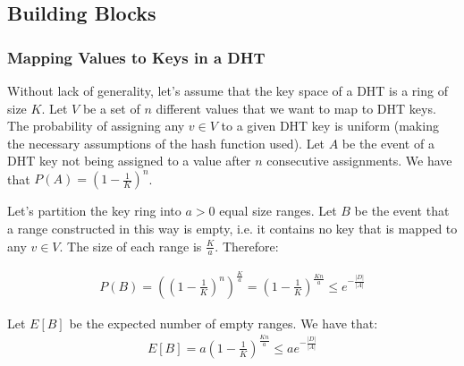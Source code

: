 \documentclass[11pt,twocolumn]{MyTightStyle}
\theoremstyle{plain}
\theoremstyle{definition}
\theoremstyle{remark}
\numberwithin{equation}{section}
\begin{document}
 




\subsection{Building Blocks}

\subsubsection{Mapping Values to Keys in a DHT}
\label{sec:mapping}

Without lack of generality, let's assume that the key space of a DHT
is a ring of size $K$. Let $V$ be a set of $n$ different values that
we want to map to DHT keys. The probability of assigning any $v \in
V$ to a given DHT key is uniform (making the necessary assumptions of
the hash function used). Let $A$ be the event of a DHT key not being
assigned to a value after $n$ consecutive assignments. We have that
$P(A) = (1- \frac{1}{K})^n$.

Let's partition the key ring into $a > 0$ equal size ranges. Let
$B$ be the event that a range constructed in this way is empty,
i.e. it contains no key that is mapped to any $v \in V$. The size of
each range is $\frac{K}{a}$. Therefore:

\begin{eqnarray*}
P(B) = ((1-\frac{1}{K})^n)^{\frac{K}{a}} =
(1-\frac{1}{K})^\frac{Kn}{a} \leq e^{-\frac{|D|}{|A|}}
\end{eqnarray*}

Let $E[B]$ be the expected number of empty ranges. We have that:
\begin{eqnarray*}
E[B] = a(1-\frac{1}{K})^\frac{Kn}{a} \leq ae^{-\frac{|D|}{|A|}}
\end{eqnarray*}   
\end{document}
